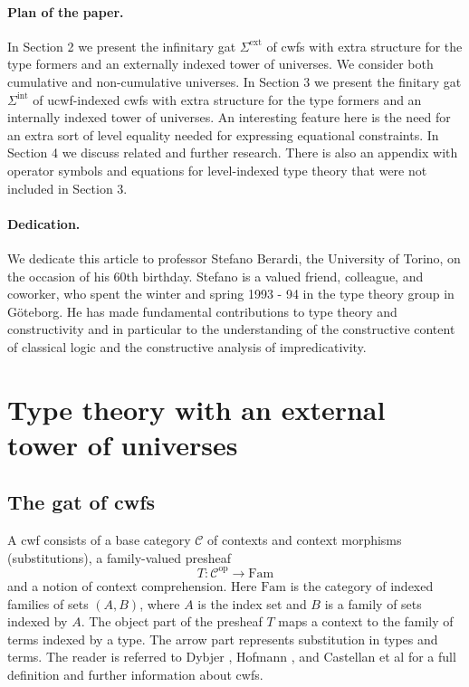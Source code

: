 \documentclass[11pt,a4paper]{article}
\theoremstyle{definition}
\newcommand{\op}{\mathrm{op}}
\def\Fam{\mathrm{Fam}}
\def\C{\mathcal{C}}
\def\Sigmaext{\Sigma^\mathrm{ext}}
\def\Sigmaint{\Sigma^\mathrm{int}}
\begin{document}
\paragraph{Plan of the paper.} In Section 2 we present the infinitary gat $\Sigmaext$ of cwfs with extra structure for the type formers and an externally indexed tower of universes. We consider both cumulative and non-cumulative universes. In Section 3 we present the finitary gat $\Sigmaint$ of ucwf-indexed cwfs with extra structure for the type formers and an internally indexed tower of universes. An interesting feature here is the need for an extra sort of level equality needed for expressing equational constraints.
In Section 4 we discuss related and further research. There is also an appendix with operator symbols and equations for level-indexed type theory that were not included in Section 3.

\paragraph{Dedication.} We dedicate this article to professor Stefano Berardi, the University of Torino, on the occasion of his 60th birthday. Stefano is a valued friend, colleague, and coworker, who spent the winter and spring 1993 - 94 in the type theory group in Göteborg. He has made fundamental contributions to type theory and constructivity and in particular to the understanding of the constructive content of classical logic and the constructive analysis of impredicativity.

\section{Type theory with an external tower of universes}

\subsection{The gat of cwfs} A cwf consists of a base category $\C$ of contexts and context morphisms (substitutions), a family-valued presheaf
$$
T : \C^\op \to \Fam
$$
and a notion of context comprehension. Here $\Fam$ is the category of indexed families of sets $(A,B)$, where $A$ is the index set and $B$ is a family of sets indexed by $A$. The object part of the presheaf $T$ maps a context to the family of terms indexed by a type. The arrow part represents substitution in types and terms. The reader is referred to Dybjer \cite{dybjer:torino}, Hofmann \cite{hofmann:cambridge}, and Castellan et al \cite{castellan:lambek} for a full definition and further information about cwfs.
\end{document}
